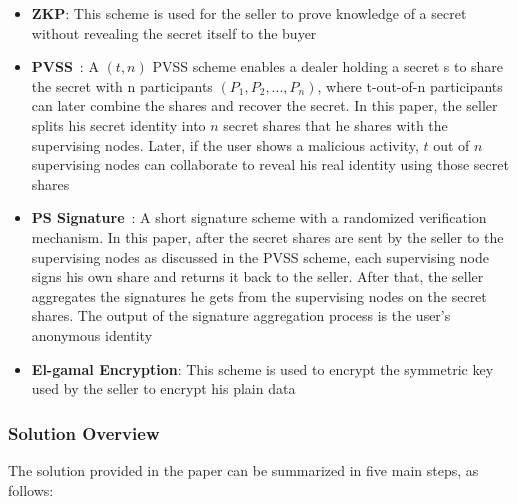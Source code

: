 \begin{itemize}
    \item \textbf{ZKP}: This scheme is used for the seller to prove knowledge of a secret without revealing the secret itself to the buyer
    \item \textbf{PVSS}~\cite{schoenmakers1999simple}: A $(t,n)$ PVSS scheme enables a dealer holding a secret s to share the secret with n participants $(P_1, P_2, ..., P_n)$, where t-out-of-n participants can later combine the shares and recover the secret. In this paper, the seller splits his secret identity into $n$ secret shares that he shares with the supervising nodes. Later, if the user shows a malicious activity, $t$ out of $n$ supervising nodes can collaborate to reveal his real identity using those secret shares
    \item \textbf{PS Signature}~\cite{pointcheval2018reassessing}: A short signature scheme with a randomized verification mechanism. In this paper, after the secret shares are sent by the seller to the supervising nodes as discussed in the PVSS scheme, each supervising node signs his own share and returns it back to the seller. After that, the seller aggregates the signatures he gets from the supervising nodes on the secret shares. The output of the signature aggregation process is the user's anonymous identity
    \item \textbf{El-gamal Encryption}: This scheme is used to encrypt the symmetric key used by the seller to encrypt his plain data
\end{itemize}

\subsubsection{Solution Overview}
The solution provided in the paper can be summarized in five main steps, as follows:

